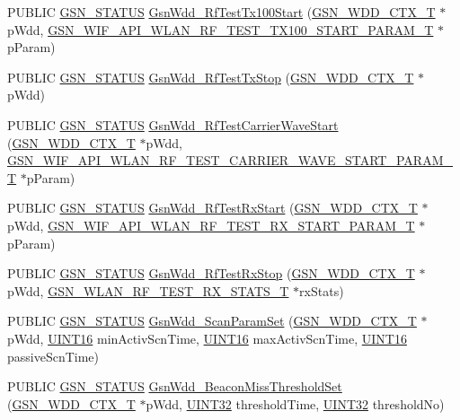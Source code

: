 \begin{DoxyCompactItemize}
\item 
PUBLIC \hyperlink{a00660_gada5951904ac6110b1fa95e51a9ddc217}{GSN\_\-STATUS} \hyperlink{a00603_a4f2d0bbf3e44dd436c9d7837159bfba6}{GsnWdd\_\-RfTestTx100Start} (\hyperlink{a00108}{GSN\_\-WDD\_\-CTX\_\-T} $\ast$pWdd, \hyperlink{a00189}{GSN\_\-WIF\_\-API\_\-WLAN\_\-RF\_\-TEST\_\-TX100\_\-START\_\-PARAM\_\-T} $\ast$pParam)
\item 
PUBLIC \hyperlink{a00660_gada5951904ac6110b1fa95e51a9ddc217}{GSN\_\-STATUS} \hyperlink{a00603_a0de70987c36f03735533433b4d7a4c4d}{GsnWdd\_\-RfTestTxStop} (\hyperlink{a00108}{GSN\_\-WDD\_\-CTX\_\-T} $\ast$pWdd)
\item 
PUBLIC \hyperlink{a00660_gada5951904ac6110b1fa95e51a9ddc217}{GSN\_\-STATUS} \hyperlink{a00603_af9b8aa48bc08efbd172f329277b24d1f}{GsnWdd\_\-RfTestCarrierWaveStart} (\hyperlink{a00108}{GSN\_\-WDD\_\-CTX\_\-T} $\ast$pWdd, \hyperlink{a00185}{GSN\_\-WIF\_\-API\_\-WLAN\_\-RF\_\-TEST\_\-CARRIER\_\-WAVE\_\-START\_\-PARAM\_\-T} $\ast$pParam)
\item 
PUBLIC \hyperlink{a00660_gada5951904ac6110b1fa95e51a9ddc217}{GSN\_\-STATUS} \hyperlink{a00603_a9bc8e520e5bb2951c77f80993445f255}{GsnWdd\_\-RfTestRxStart} (\hyperlink{a00108}{GSN\_\-WDD\_\-CTX\_\-T} $\ast$pWdd, \hyperlink{a00186}{GSN\_\-WIF\_\-API\_\-WLAN\_\-RF\_\-TEST\_\-RX\_\-START\_\-PARAM\_\-T} $\ast$pParam)
\item 
PUBLIC \hyperlink{a00660_gada5951904ac6110b1fa95e51a9ddc217}{GSN\_\-STATUS} \hyperlink{a00603_ab79e7fa651d79f95f4075b33636c44cb}{GsnWdd\_\-RfTestRxStop} (\hyperlink{a00108}{GSN\_\-WDD\_\-CTX\_\-T} $\ast$pWdd, \hyperlink{a00419}{GSN\_\-WLAN\_\-RF\_\-TEST\_\-RX\_\-STATS\_\-T} $\ast$rxStats)
\item 
PUBLIC \hyperlink{a00660_gada5951904ac6110b1fa95e51a9ddc217}{GSN\_\-STATUS} \hyperlink{a00603_af801d7d7722dbc9c6fe1f4028fe6a300}{GsnWdd\_\-ScanParamSet} (\hyperlink{a00108}{GSN\_\-WDD\_\-CTX\_\-T} $\ast$pWdd, \hyperlink{a00660_ga09f1a1fb2293e33483cc8d44aefb1eb1}{UINT16} minActivScnTime, \hyperlink{a00660_ga09f1a1fb2293e33483cc8d44aefb1eb1}{UINT16} maxActivScnTime, \hyperlink{a00660_ga09f1a1fb2293e33483cc8d44aefb1eb1}{UINT16} passiveScnTime)
\item 
PUBLIC \hyperlink{a00660_gada5951904ac6110b1fa95e51a9ddc217}{GSN\_\-STATUS} \hyperlink{a00603_a8c7957f946a9bbde3ebe5d53aad0722b}{GsnWdd\_\-BeaconMissThresholdSet} (\hyperlink{a00108}{GSN\_\-WDD\_\-CTX\_\-T} $\ast$pWdd, \hyperlink{a00660_gae1e6edbbc26d6fbc71a90190d0266018}{UINT32} thresholdTime, \hyperlink{a00660_gae1e6edbbc26d6fbc71a90190d0266018}{UINT32} thresholdNo)

\end{DoxyCompactItemize}
